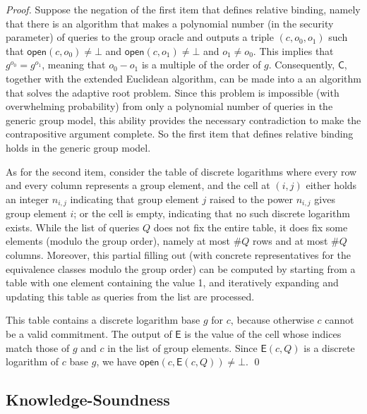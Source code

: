 \documentclass[10pt]{llncs}
\begin{document}
\begin{proof}
Suppose the negation of the first item that defines relative binding, namely that there is an algorithm that makes a polynomial number (in the security parameter) of queries to the group oracle and outputs a triple $(c, o_0, o_1)$ such that $\mathsf{open}(c, o_0) \neq \bot$ and $\mathsf{open}(c, o_1) \neq \bot$ and $o_1 \neq o_0$. This implies that $g^{o_0} = g^{o_1}$, meaning that $o_0 - o_1$ is a multiple of the order of $g$. Consequently, $\mathsf{C}$, together with the extended Euclidean algorithm, can be made into a an algorithm that solves the adaptive root problem. Since this problem is impossible (with overwhelming probability) from only a polynomial number of queries in the generic group model, this ability provides the necessary contradiction to make the contrapositive argument complete. So the first item that defines relative binding holds in the generic group model.

As for the second item, consider the table of discrete logarithms where every row and every column represents a group element, and the cell at $(i, j)$ either holds an integer $n_{i,j}$ indicating that group element $j$ raised to the power $n_{i,j}$ gives group element $i$; or the cell is empty, indicating that no such discrete logarithm exists. While the list of queries $Q$ does not fix the entire table, it does fix some elements (modulo the group order), namely at most $\#Q$ rows and at most $\#Q$ columns. Moreover, this partial filling out (with concrete representatives for the equivalence classes modulo the group order) can be computed by starting from a table with one element containing the value 1, and iteratively expanding and updating this table as queries from the list are processed.

This table contains a discrete logarithm base $g$ for $c$, because otherwise $c$ cannot be a valid commitment. The output of $\mathsf{E}$ is the value of the cell whose indices match those of $g$ and $c$ in the list of group elements. Since $\mathsf{E}(c, Q)$ is a discrete logarithm of $c$ base $g$, we have $\mathsf{open}(c, \mathsf{E}(c,Q)) \neq \bot$. \qed
\end{proof}

\subsection{Knowledge-Soundness} \label{subsection:knowledge_soundness}



{}

\end{document}
